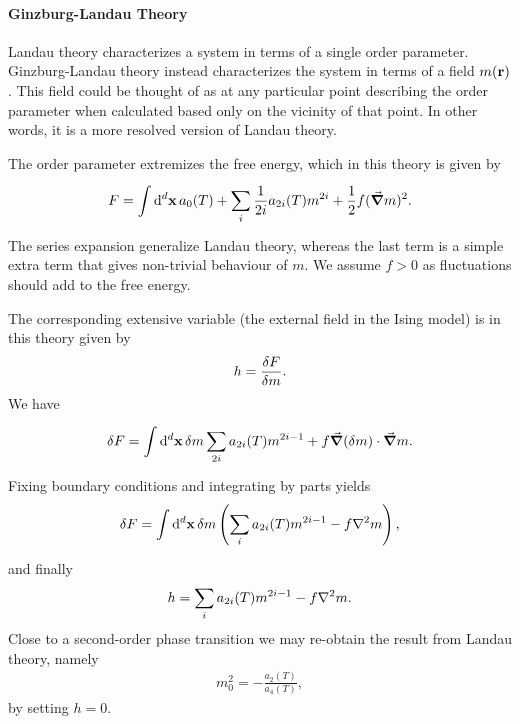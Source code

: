 \paragraph{Ginzburg-Landau Theory}
Landau theory characterizes a system in terms of a single order parameter. Ginzburg-Landau theory instead characterizes the system in terms of a field $m(\vb{r})$. This field could be thought of as at any particular point describing the order parameter when calculated based only on the vicinity of that point. In other words, it is a more resolved version of Landau theory.

The order parameter extremizes the free energy, which in this theory is given by
\begin{align*}
	F = \int\limits_{}^{}\dd[d]{\vb{x}}a_{0}(T) + \sum\limits_{i}\frac{1}{2i}a_{2i}(T)m^{2i} + \frac{1}{2}f(\grad{m})^{2}.
\end{align*}
The series expansion generalize Landau theory, whereas the last term is a simple extra term that gives non-trivial behaviour of $m$. We assume $f > 0$ as fluctuations should add to the free energy.

The corresponding extensive variable (the external field in the Ising model) is in this theory given by
\begin{align*}
	h = \fdv{F}{m}.
\end{align*}
We have
\begin{align*}
	\var{F} = \int\limits_{}^{}\dd[d]{\vb{x}}\var{m}\sum\limits_{2i}a_{2i}(T)m^{2i - 1} + f\grad{(\var{m})}\cdot\grad{m}.
\end{align*}
Fixing boundary conditions and integrating by parts yields
\begin{align*}
	\var{F} = \integ[d]{}{}{\vb{x}}{\var{m}\left(\sum\limits_{i}a_{2i}(T)m^{2i - 1} - f\laplacian{m}\right)},
\end{align*}
and finally
\begin{align*}
	h = \sum\limits_{i}a_{2i}(T)m^{2i - 1} - f\laplacian{m}.
\end{align*}
Close to a second-order phase transition we may re-obtain the result from Landau theory, namely
\begin{align*}
	m_{0}^{2} = -\frac{a_{2}(T)}{a_{4}(T)},
\end{align*}
by setting $h = 0$.

